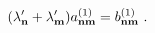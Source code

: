 \begin{equation}
(\lambda _{\mathbf{n}}^{\prime }+\lambda _{\mathbf{m}}^{\prime })a_{\mathbf{%
nm}}^{(1)}=b_{\mathbf{nm}}^{(1)}\,\,.  \label{Loprime}
\end{equation}%
